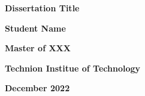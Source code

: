 \thispagestyle{empty}
\begin{center}
\Large

\textbf{Dissertation Title}

\vspace{2.0in}

\textbf{Student Name}

\vspace{1.5in}

\textbf{Master of XXX}

\vspace{0.5in}

\textbf{Technion Institue of Technology}


\textbf{December 2022}

\end{center}